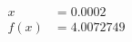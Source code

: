 \documentclass[preview]{standalone}
\begin{document}
\begin{align*}
x &= 0.0002\\f(x) &= 4.0072749
\end{align*}
\end{document}

